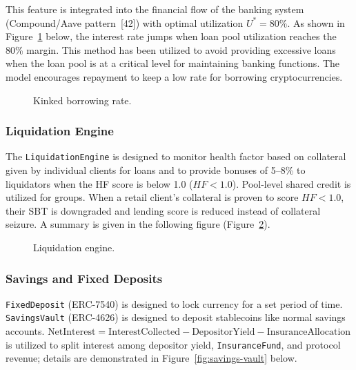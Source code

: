 This feature is integrated into the financial flow of the banking system (Compound/Aave pattern~[42]) with optimal utilization $U^* = 80\%$. As shown in Figure~\ref{fig:kinked-rate-curve} below, the interest rate jumps when loan pool utilization reaches the 80\% margin. This method has been utilized to avoid providing excessive loans when the loan pool is at a critical level for maintaining banking functions. The model encourages repayment to keep a low rate for borrowing cryptocurrencies.

\begin{figure}[H]
\centering
{}
\caption[Kinked borrowing rate]{Kinked borrowing rate.}
\label{fig:kinked-rate-curve}
\end{figure}

\subsubsection{Liquidation Engine}
\label{sec:liquidation}

The \texttt{LiquidationEngine} is designed to monitor health factor based on collateral given by individual clients for loans and to provide bonuses of 5--8\% to liquidators when the HF score is below 1.0 ($HF < 1.0$). Pool-level shared credit is utilized for groups. When a retail client's collateral is proven to score $HF < 1.0$, their SBT is downgraded and lending score is reduced instead of collateral seizure. A summary is given in the following figure (Figure~\ref{fig:liquidation-engine}).

\begin{figure}[H]
\centering
{}
\caption[Liquidation engine]{Liquidation engine.}
\label{fig:liquidation-engine}
\end{figure}

\subsubsection{Savings and Fixed Deposits}
\label{sec:savings-vault}

\texttt{FixedDeposit} (ERC-7540) is designed to lock currency for a set period of time. \texttt{SavingsVault} (ERC-4626) is designed to deposit stablecoins like normal savings accounts. $\text{NetInterest} = \text{InterestCollected} - \text{DepositorYield} - \text{InsuranceAllocation}$ is utilized to split interest among depositor yield, \texttt{InsuranceFund}, and protocol revenue; details are demonstrated in Figure~\ref{fig:savings-vault} below.

